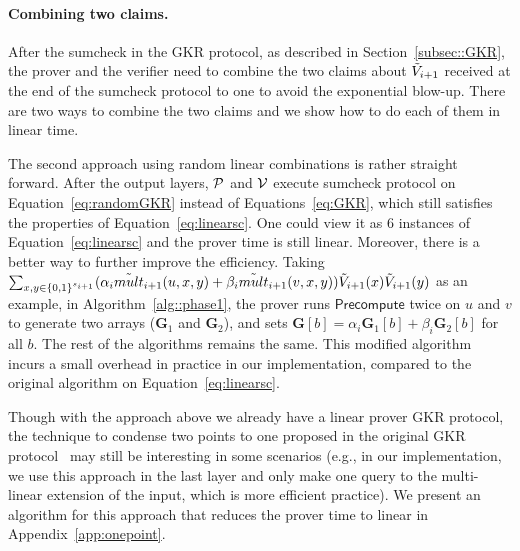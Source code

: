 \paragraph{Combining two claims.} After the sumcheck in the GKR protocol, as described in Section~\ref{subsec::GKR}, the prover and the verifier need to combine the two claims about $\tV_{i+1}$ received at the end of the sumcheck protocol to one to avoid the exponential blow-up. There are two ways to combine the two claims and we show how to do each of them in linear time. 

The second approach using random linear combinations is rather straight forward. After the output layers, $\P$ and $\V$ execute sumcheck protocol on Equation~\ref{eq:randomGKR} instead of Equations~\ref{eq:GKR}, which still satisfies the properties of Equation~\ref{eq:linearsc}. One could view it as 6 instances of Equation~\ref{eq:linearsc} and the prover time is still linear. Moreover, there is a better way to further improve the efficiency. Taking $\sum_{x, y \in\binary^{s_{i+1}}}(\alpha_i\tmult_{i+1}(u,x,y)+\beta_i\tmult_{i+1}(v,x,y))\tV_{i+1}(x)\tV_{i+1}(y)$ as an example, in Algorithm~\ref{alg::phase1}, the prover runs $\mathsf{Precompute}$ twice on $u$ and $v$ to generate two arrays ($\textbf{G}_1$ and $\textbf{G}_2$), and sets $\textbf{G}[b]=\alpha_i \textbf{G}_1[b] + \beta_i\textbf{G}_2[b]$ for all $b$. The rest of the algorithms remains the same. This modified algorithm incurs a small overhead in practice in our implementation, compared to the original algorithm on Equation~\ref{eq:linearsc}.

Though with the approach above we already have a linear prover GKR protocol, the technique to condense two points to one proposed in the original GKR protocol~\cite{GKR} may still be interesting in some scenarios (e.g., in our implementation, we use this approach in the last layer and only make one query to the multi-linear extension of the input, which is more efficient practice). We present an algorithm for this approach that reduces the prover time to linear in Appendix~\ref{app:onepoint}.





